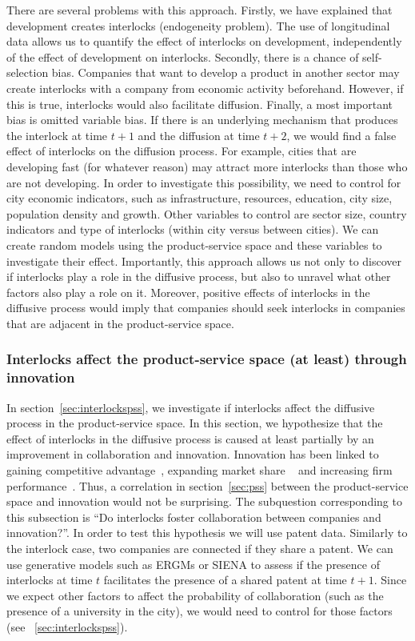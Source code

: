 There are several problems with this approach.
Firstly, we have explained that development creates interlocks (endogeneity problem).
The use of longitudinal data allows us to quantify the effect of interlocks on development,
independently of the effect of development on interlocks.
Secondly, there is a chance of self-selection bias.
Companies that want to develop a product in another sector may create interlocks with a company from economic activity beforehand.
However, if this is true, interlocks would also facilitate diffusion.
Finally, a most important bias is omitted variable bias.
If there is an underlying mechanism that produces the interlock at time $t + 1$ and the diffusion at time $t + 2$, 
we would find a false effect of interlocks on the diffusion process.
For example, cities that are developing fast (for whatever reason) may attract more interlocks than those who are not developing.
In order to investigate this possibility, we need to control for city economic indicators, such as infrastructure, resources, education, city size, population density and growth.
Other variables to control are sector size, country indicators and type of interlocks (within city versus between cities).
We can create random models using the product-service space and these variables to investigate their effect.
Importantly, this approach allows us not only to discover if interlocks play a role in the diffusive process, 
but also to unravel what other factors also play a role on it.
Moreover, positive effects of interlocks in the diffusive process would imply that companies should seek interlocks in companies that are adjacent in the product-service space.


\subsubsection{Interlocks affect the product-service space (at least) through innovation}
In section~\ref{sec:interlockspss}, we investigate if interlocks affect the diffusive process in the product-service space.
In this section, we hypothesize that the effect of interlocks in the diffusive process is caused at least partially by an improvement in collaboration and innovation.
Innovation has been linked to gaining competitive advantage~\citep{Hitt1996}, expanding market share ~\citep{Franko1989} and increasing firm performance~\citep{Morbey1988}.
Thus, a correlation in section~\ref{sec:pss} between the product-service space and innovation would not be surprising. 
The subquestion corresponding to this subsection is ``Do interlocks foster collaboration between companies and innovation?''.
In order to test this hypothesis we will use patent data.
Similarly to the interlock case, two companies are connected if they share a patent.
We can use generative models such as ERGMs or SIENA to assess if the presence of interlocks at time $t$ facilitates the presence of a shared patent at time $t+1$. 
Since we expect other factors to affect the probability of collaboration (such as the presence of a university in the city),
we would need to control for those factors (see ~\ref{sec:interlockspss}).


